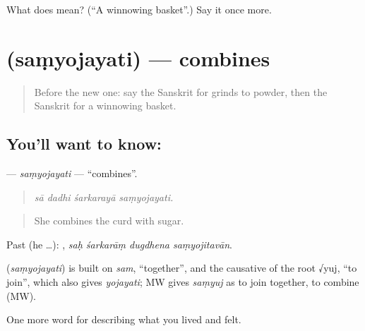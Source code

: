 \begin{tcolorbox}[breakable,colback=teal!4,colframe=teal!35!black,title={Before you move on}]
What does  mean? (\textquotedblleft{}A winnowing basket\textquotedblright{}.) Say it once more.
\end{tcolorbox}
\section[\texorpdfstring{\sk{संयोजयति} (saṃyojayati)}{संयोजयति (saṃyojayati)}]{ (saṃyojayati) — combines}

\label{lesson:SA-C512-samyojayati}



\begin{quote}
Before the new one: say the Sanskrit for grinds to powder, then the Sanskrit for a winnowing basket.
\end{quote}

\subsection*{You'll want to know: }
\textbf{} — \emph{saṃyojayati} — \textquotedblleft{}combines\textquotedblright{}.

\begin{quote}
   
\end{quote}

\begin{quote}
\emph{sā dadhi śarkarayā saṃyojayati.}
\end{quote}

\begin{quote}
She combines the curd with sugar.
\end{quote}

Past (he …):    , \emph{saḥ śarkarāṃ dugdhena saṃyojitavān}.

\begin{cousinweb}
\textbf{} (\emph{saṃyojayati}) is built on \emph{sam}, \textquotedblleft{}together\textquotedblright{}, and the causative of the root √yuj, \textquotedblleft{}to join\textquotedblright{}, which also gives \emph{yojayati}; MW gives \emph{saṃyuj} as to join together, to combine (MW).
\end{cousinweb}

\begin{grammarlens}[title={What you've built}]
One more word for describing what you lived and felt.
\end{grammarlens}

